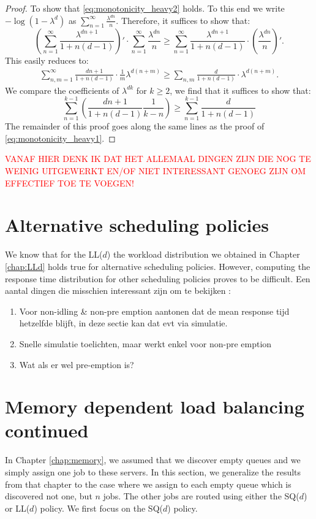 \documentclass[12pt]{report}
\begin{document}
\begin{proof}
	To show that \eqref{eq:monotonicity_heavy2} holds. To this end we write $-\log(1-\lambda^d)$ as $\sum_{n=1}^\infty \frac{\lambda^{dn}}{n}$. Therefore, it suffices to show that:
	$$
	\left( \sum_{n=1}^\infty \frac{\lambda^{dn+1}}{1+n(d-1)} \right)' \cdot \sum_{n=1}^\infty \frac{\lambda^{dn}}{n} \geq \sum_{n=1}^\infty \frac{\lambda^{dn+1}}{1+n(d-1)} \cdot\left(\frac{\lambda^{dn}}{n}\right)'.
	$$
	This easily reduces to:
	\begin{align*}
		\sum_{n,m=1}^\infty \frac{dn+1}{1+n(d-1)} \cdot \frac{1}{m} \lambda ^{d(n+m)} \geq \sum_{n,m} \frac{d}{1+n(d-1)} \cdot \lambda^{d(n+m)}.
	\end{align*}
	We compare the coefficients of $\lambda^{dk}$ for $k \geq 2$, we find that it suffices to show that:
	$$
	\sum_{n=1}^{k-1} \left( \frac{dn+1}{1+n(d-1)} \frac{1}{k-n} \right) \geq \sum_{n=1}^{k-1} \frac{d}{1+n(d-1)}
	$$
	The remainder of this proof goes along the same lines as the proof of \eqref{eq:monotonicity_heavy1}.
\end{proof}

\textcolor{red}{
VANAF HIER DENK IK DAT HET ALLEMAAL DINGEN ZIJN DIE NOG TE WEINIG UITGEWERKT EN/OF NIET INTERESSANT GENOEG ZIJN OM EFFECTIEF TOE TE VOEGEN!	
}
\section{Alternative scheduling policies}
We know that for the LL($d$) the workload distribution we obtained in Chapter \ref{chap:LLd} holds true for alternative scheduling policies. However, computing the response time distribution for other scheduling policies proves to be difficult. Een aantal dingen die misschien interessant zijn om te bekijken :
\begin{enumerate}
\item Voor non-idling \& non-pre emption aantonen dat de mean response tijd hetzelfde blijft, in deze sectie kan dat evt via simulatie.
\item Snelle simulatie toelichten, maar werkt enkel voor non-pre emption
\item Wat als er wel pre-emption is?
\end{enumerate}

\section{Memory dependent load balancing continued}
In Chapter \ref{chap:memory}, we assumed that we discover empty queues and we simply assign one job to these servers. In this section, we generalize the results from that chapter to the case where we assign to each empty queue which is discovered not one, but $n$ jobs. The other jobs are routed using either the SQ($d$) or LL($d$) policy. We first focus on the SQ($d$) policy.
\end{document}
